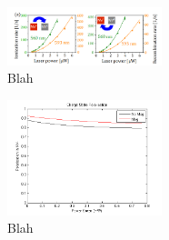 \documentclass[prl]{revtex4}
\begin{document}
\begin{figure}[H]
  \centering
  \includegraphics[width=0.4\textwidth]{IonRateCompare.png} 
 \caption{Blah} 
\end{figure}

\begin{figure}[H]
  \centering
  \includegraphics[width=0.4\textwidth]{ChargeData.png} 
 \caption{Blah} 
\end{figure}
\end{document}
